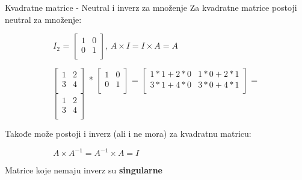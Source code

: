 \documentclass[bookmarks=true,bookmarksopen=true,pdfborder={0 0 0},pdfhighlight={/N},linkbordercolor={.5 .5 .5},implicit=false,unicode,xcolor={table}]{beamer}
\begin{document}
\begin{frame}{Kvadratne matrice - Neutral i inverz za množenje}
  Za kvadratne matrice postoji neutral za množenje:
  \begin{figure}
    \begin{subfigure}{7cm}
      $I_{2}$ = 
      $\begin{bmatrix}
        1 & 0\\
        0 & 1\\
        \end{bmatrix}$,
      \hfill
      $A \times I = I \times A = A$
    \end{subfigure}
  \end{figure}

  \begin{figure}
    \begin{subfigure}{10cm}
      $\begin{bmatrix}
        1 & 2\\
        3 & 4\\
        \end{bmatrix}$
      *
      $\begin{bmatrix}
        1 & 0\\
        0 & 1\\
        \end{bmatrix}$
      = 
      $\begin{bmatrix}
        1*1 + 2*0 & 1*0 + 2*1\\
        3*1 + 4*0 & 3*0 + 4*1\\
        \end{bmatrix}$
      = 
      $\begin{bmatrix}
        1 & 2\\
        3 & 4\\
        \end{bmatrix}$
    \end{subfigure}
  \end{figure}
  Takođe može postoji i inverz (ali i ne mora) za kvadratnu matricu:
  \begin{figure}
    \begin{subfigure}{5cm}
      $A \times A^{-1} = A^{-1} \times A = I$
    \end{subfigure}
  \end{figure}
  Matrice koje nemaju inverz su \textbf{singularne}

\end{frame}
\end{document}
